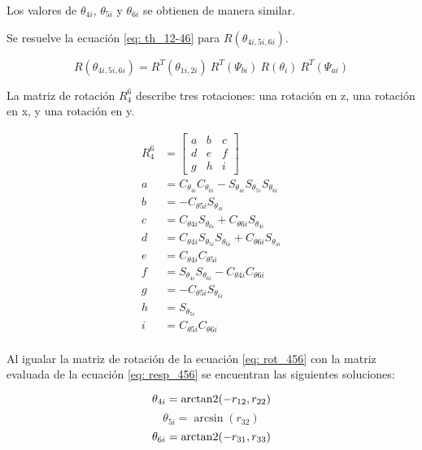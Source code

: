 Los valores de 
$\theta_{4i}$, $\theta_{5i}$ y $\theta_{6i}$ 
se obtienen de manera similar.

Se resuelve la ecuación \eqref{eq: th_12-46} para 
$R(\theta_{4i,5i,6i})$.

\begin{equation}\label{eq: resp_456}
    R(\theta_{4i,5i,6i})= R^T(\theta_{1i,2i})\ R^T(\Psi_{bi})\ R(\theta_i)\ R^T(\Psi_{ai})
\end{equation}

La matriz de rotación $R_4^6$ describe tres rotaciones: 
una rotación en z, una rotación en x, y una rotación en y.

\begin{subequations}
    \begin{align}
R_4^6 &= \begin{bmatrix}
         a & b & c\\
         d & e & f\\
         g & h & i
        \end{bmatrix}\label{eq: rot_456}\\
a &= C_{\theta_{4i}} C_{\theta_{6i}} - S_{\theta_{4i}} S_{\theta_{5i}} S_{\theta_{6i}}\\
b &= -C_{\theta{5i}} S_{\theta_{4i}}\\
c &= C_{\theta{4i}} S_{\theta_{6i}} + C_{\theta{6i}} S_{\theta_{4i}}\\
d &= C_{\theta{4i}} S_{\theta_{5i}} S_{\theta_{6i}} +C_{\theta{6i}} S_{\theta_{4i}} \\
e &= C_{\theta{4i}} C_{\theta{5i}}\\
f &= S_{\theta_{4i}} S_{\theta_{6i}} -C_{\theta{4i}} C_{\theta{6i}}\\
g &= -C_{\theta{5i}} S_{\theta_{6i}}\\
h &= S_{\theta_{5i}}\\ 
i &= C_{\theta{5i}} C_{\theta{6i}}\\
    \end{align}
\end{subequations}

Al igualar la matriz de rotación de la 
ecuación \eqref{eq: rot_456} con la matriz 
evaluada de la ecuación \eqref{eq: resp_456} 
se encuentran las siguientes soluciones:

\begin{equation}
\theta_{4i} = \operatorname{arctan2} (-r_{12},r_{22})
\end{equation}
\begin{equation}
\theta_{5i} = \arcsin (r_{32})
\end{equation}
\begin{equation}
\theta_{6i} = \operatorname{arctan2} (-r_{31},r_{33})
\end{equation}

